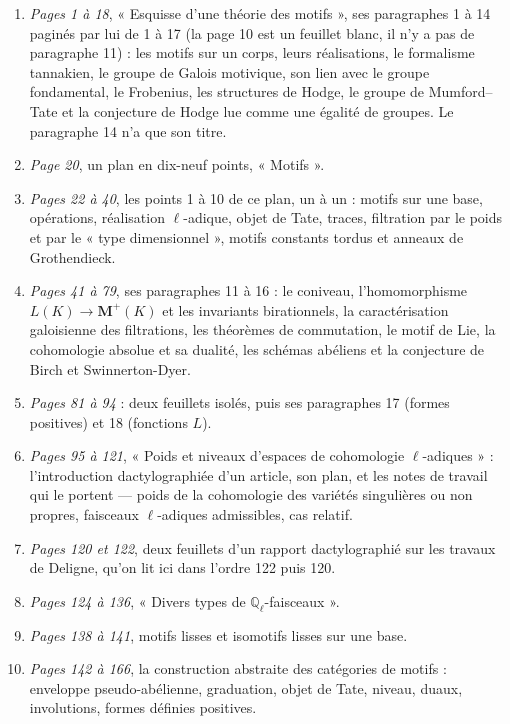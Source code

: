 \documentclass[11pt,a4paper]{article}
\begin{document}
\begin{enumerate}
  \item \emph{Pages 1 à 18}, « Esquisse d'une théorie des motifs », ses
  paragraphes 1 à 14 paginés par lui de 1 à 17 (la page 10 est un feuillet
  blanc, il n'y a pas de paragraphe 11) : les motifs sur un corps, leurs
  réalisations, le formalisme tannakien, le groupe de Galois motivique, son
  lien avec le groupe fondamental, le Frobenius, les structures de Hodge, le
  groupe de Mumford--Tate et la conjecture de Hodge lue comme une égalité de
  groupes. Le paragraphe 14 n'a que son titre.
  \item \emph{Page 20}, un plan en dix-neuf points, « Motifs ».
  \item \emph{Pages 22 à 40}, les points 1 à 10 de ce plan, un à un : motifs
  sur une base, opérations, réalisation $\ell$-adique, objet de Tate, traces,
  filtration par le poids et par le « type dimensionnel », motifs constants
  tordus et anneaux de Grothendieck.
  \item \emph{Pages 41 à 79}, ses paragraphes 11 à 16 : le coniveau,
  l'homomorphisme $L(K) \to \mathbf{M}^{+}(K)$ et les invariants birationnels,
  la caractérisation galoisienne des filtrations, les théorèmes de commutation,
  le motif de Lie, la cohomologie absolue et sa dualité, les schémas abéliens
  et la conjecture de Birch et Swinnerton-Dyer.
  \item \emph{Pages 81 à 94} : deux feuillets isolés, puis ses paragraphes 17
  (formes positives) et 18 (fonctions $L$).
  \item \emph{Pages 95 à 121}, « Poids et niveaux d'espaces de cohomologie
  $\ell$-adiques » : l'introduction dactylographiée d'un article, son plan, et
  les notes de travail qui le portent --- poids de la cohomologie des variétés
  singulières ou non propres, faisceaux $\ell$-adiques admissibles, cas
  relatif.
  \item \emph{Pages 120 et 122}, deux feuillets d'un rapport dactylographié
  sur les travaux de Deligne, qu'on lit ici dans l'ordre 122 puis 120.
  \item \emph{Pages 124 à 136}, « Divers types de $\mathbb{Q}_{\ell}$-faisceaux ».
  \item \emph{Pages 138 à 141}, motifs lisses et isomotifs lisses sur une base.
  \item \emph{Pages 142 à 166}, la construction abstraite des catégories de
  motifs : enveloppe pseudo-abélienne, graduation, objet de Tate, niveau,
  duaux, involutions, formes définies positives.
\end{enumerate}
\end{document}
